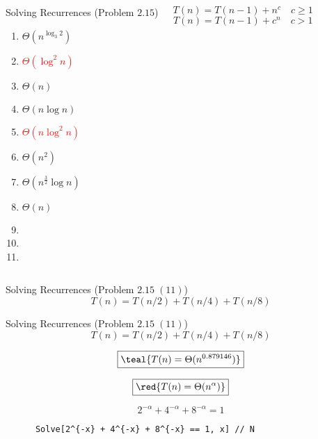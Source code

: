 \begin{frame}{}
  \begin{columns}
      \begin{exampleblock}{Solving Recurrences (Problem $2.15$)}
	\begin{enumerate}[(1)]
	  \item $\Theta(n^{\log_3 2})$
	  \item \textcolor{red}{$\Theta(\log^2 n)$}
	  \item $\Theta(n)$
	  \item $\Theta(n \log n)$
	  \item \textcolor{red}{$\Theta(n \log^2 n)$}
	  \item $\Theta(n^2)$
	  \item $\Theta(n^{\frac{3}{2}}\log n)$
	  \item $\Theta(n)$
	  \item {}
	  \item {}
	  \item \purple{$\cdots$}
	\end{enumerate}
      \end{exampleblock}
      \[
	T(n) = T(n-1) + n^c \quad c \ge 1
      \]
      \[
	T(n) = T(n-1) + c^n \quad c > 1
      \]
  \end{columns}
\end{frame}

\begin{frame}[fragile]{}
  \begin{exampleblock}{Solving Recurrences (Problem $2.15\; (11)$)}
    \[
      T(n) = T(n/2) + T(n/4) + T(n/8)
    \]
  \end{exampleblock}

  \pause
  \vspace{0.50cm}
\end{frame}

\begin{frame}[fragile]{}
  \begin{exampleblock}{Solving Recurrences (Problem $2.15\; (11)$)}
    \[
      T(n) = T(n/2) + T(n/4) + T(n/8)
    \]
  \end{exampleblock}

  \pause
  \vspace{0.30cm}
  \[
    \boxed{\teal{T(n) = \Theta(n^{0.879146})}}
  \]

  \pause
  \vspace{0.30cm}
  \[
    \boxed{\red{T(n) = \Theta(n^\alpha)}}
  \]

  \pause
  \vspace{0.30cm}
  \[
    2^{-\alpha} + 4^{-\alpha} + 8^{-\alpha} = 1
  \]

  \pause
  \vspace{0.30cm}
  \begin{center}
    \begin{verbatim}
      Solve[2^{-x} + 4^{-x} + 8^{-x} == 1, x] // N
    \end{verbatim}
  \end{center}
\end{frame}

